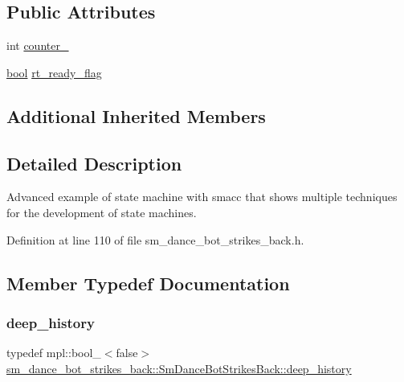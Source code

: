 \subsection*{Public Attributes}
\begin{DoxyCompactItemize}
\item 
int \hyperlink{structsm__dance__bot__strikes__back_1_1SmDanceBotStrikesBack_a0cf56e316022dde4b3da552ab9f68513}{counter\+\_}
\item 
\hyperlink{classbool}{bool} \hyperlink{structsm__dance__bot__strikes__back_1_1SmDanceBotStrikesBack_a609265a94c2575580fbb014f551a066a}{rt\+\_\+ready\+\_\+flag}
\end{DoxyCompactItemize}
\subsection*{Additional Inherited Members}


\subsection{Detailed Description}
Advanced example of state machine with smacc that shows multiple techniques for the development of state machines. 

Definition at line 110 of file sm\+\_\+dance\+\_\+bot\+\_\+strikes\+\_\+back.\+h.



\subsection{Member Typedef Documentation}
\mbox{\label{structsm__dance__bot__strikes__back_1_1SmDanceBotStrikesBack_a3192d4079cbcf0739c7002538767ad22}} 
\subsubsection{\texorpdfstring{deep\+\_\+history}{deep\_history}}
{\footnotesize\ttfamily typedef mpl\+::bool\+\_\+$<$false$>$ \hyperlink{structsm__dance__bot__strikes__back_1_1SmDanceBotStrikesBack_a3192d4079cbcf0739c7002538767ad22}{sm\+\_\+dance\+\_\+bot\+\_\+strikes\+\_\+back\+::\+Sm\+Dance\+Bot\+Strikes\+Back\+::deep\+\_\+history}}



